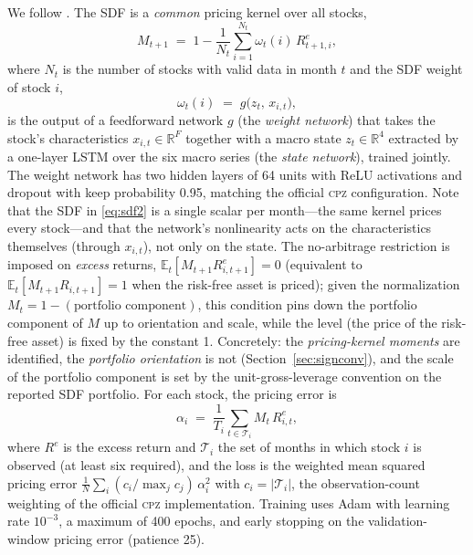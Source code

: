 \documentclass[12pt]{article}
\begin{document}
We follow \citet{cpz2024}. The SDF is a \emph{common} pricing kernel over all stocks,
\begin{equation}
M_{t+1} \;=\; 1 - \frac{1}{N_t}\sum_{i=1}^{N_t} \omega_t(i)\, R^e_{t+1,i},
\label{eq:sdf2}
\end{equation}
where $N_t$ is the number of stocks with valid data in month $t$ and the SDF weight of stock $i$,
\begin{equation}
\omega_t(i) \;=\; g\bigl(z_t,\, x_{i,t}\bigr),
\label{eq:omega}
\end{equation}
is the output of a feedforward network $g$ (the \emph{weight network}) that takes the stock's characteristics $x_{i,t}\in\mathbb{R}^F$ together with a macro state $z_t\in\mathbb{R}^4$ extracted by a one-layer LSTM over the six macro series (the \emph{state network}), trained jointly. The weight network has two hidden layers of 64 units with ReLU activations and dropout with keep probability 0.95, matching the official \textsc{cpz} configuration. Note that the SDF in \eqref{eq:sdf2} is a single scalar per month---the same kernel prices every stock---and that the network's nonlinearity acts on the characteristics themselves (through $x_{i,t}$), not only on the state. The no-arbitrage restriction is imposed on \emph{excess} returns, $\mathbb{E}_t[M_{t+1}R^e_{i,t+1}]=0$ (equivalent to $\mathbb{E}_t[M_{t+1}R_{i,t+1}]=1$ when the risk-free asset is priced); given the normalization $M_t = 1 - (\text{portfolio component})$, this condition pins down the portfolio component of $M$ up to orientation and scale, while the level (the price of the risk-free asset) is fixed by the constant 1. Concretely: the \emph{pricing-kernel moments} are identified, the \emph{portfolio orientation} is not (Section~\ref{sec:signconv}), and the scale of the portfolio component is set by the unit-gross-leverage convention on the reported SDF portfolio. For each stock, the pricing error is
\begin{equation}
\alpha_i \;=\; \frac{1}{T_i}\sum_{t\in\mathcal{T}_i} M_t\, R^e_{i,t},
\label{eq:alpha}
\end{equation}
where $R^e$ is the excess return and $\mathcal{T}_i$ the set of months in which stock $i$ is observed (at least six required), and the loss is the weighted mean squared pricing error $\frac{1}{N}\sum_i (c_i/\max_j c_j)\, \alpha_i^2$ with $c_i=|\mathcal{T}_i|$, the observation-count weighting of the official \textsc{cpz} implementation. Training uses Adam with learning rate $10^{-3}$, a maximum of 400 epochs, and early stopping on the validation-window pricing error (patience 25).
\end{document}
